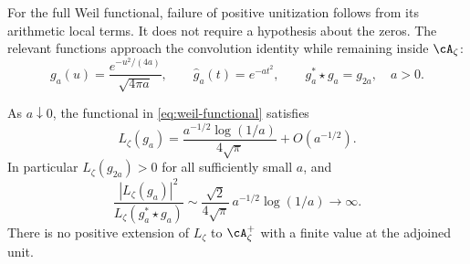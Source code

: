 For the full Weil functional, failure of positive unitization follows
from its arithmetic local terms.  It does not require a hypothesis about
the zeros.  The relevant functions approach the convolution identity
while remaining inside $\cA_\zeta$:
\begin{equation}
 g_a(u)=\frac{e^{-u^2/(4a)}}{\sqrt{4\pi a}},
 \qquad \widehat g_a(t)=e^{-at^2},
 \qquad g_a^*\star g_a=g_{2a},\quad a>0.
 \label{eq:gaussian-semigroup}
\end{equation}

\begin{theorem}
\label{thm:weil-mass}
As $a\downarrow0$, the functional in \eqref{eq:weil-functional} satisfies
\begin{equation}
 L_\zeta(g_a)
 =\frac{a^{-1/2}\log(1/a)}{4\sqrt\pi}+O(a^{-1/2}).
 \label{eq:weil-gaussian-asymptotic}
\end{equation}
In particular $L_\zeta(g_{2a})>0$ for all sufficiently small $a$, and
\begin{equation}
 \frac{|L_\zeta(g_a)|^2}{L_\zeta(g_a^*\star g_a)}
 \sim\frac{\sqrt2}{4\sqrt\pi}\,a^{-1/2}\log(1/a)
 \longrightarrow\infty.
 \label{eq:weil-unitization-divergence}
\end{equation}
There is no positive extension of $L_\zeta$ to $\cA_\zeta^+$ with a
finite value at the adjoined unit.
\end{theorem}

